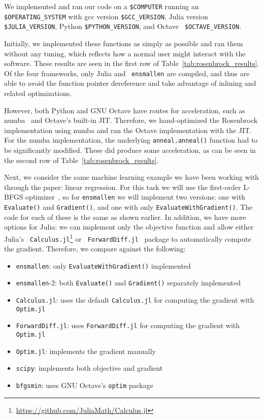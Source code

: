\documentclass{article}
\begin{document}
We implemented and ran our code on a {\tt \$COMPUTER} running an {\tt
\$OPERATING\_SYSTEM} with gcc version {\tt \$GCC\_VERSION}, Julia version {\tt
\$JULIA\_VERSION}, Python {\tt \$PYTHON\_VERSION}, and Octave {\tt
\$OCTAVE\_VERSION}.

Initially, we implemented these functions as simply as possible and ran them
without any tuning, which reflects how a normal user might interact with the
software.  These results are seen in the first row of
Table~\ref{tab:rosenbrock_results}.  Of the four frameworks, only Julia and {\tt
ensmallen} are compiled, and thus are able to avoid the function pointer
dereference and take advantage of inlining and related optimizations.

However, both Python and GNU Octave have routes for acceleration, such as
numba~\cite{TODO} and Octave's built-in JIT.  Therefore, we hand-optimized the
Rosenbrock implementation using numba and ran the Octave implementation with the
JIT.  For the numba implementation, the underlying {\tt anneal.anneal()}
function had to be significantly modified.  These did produce some acceleration,
as can be seen in the second row of Table~\ref{tab:rosenbrock_results}.

Next, we consider the same machine learning example we have been working with
through the paper: linear regression.  For this task we will use the first-order
L-BFGS optimizer~\cite{zhu1997algorithm},
so for {\tt ensmallen} we will implement two versions: one with {\tt Evaluate()}
and {\tt Gradient()}, and one with only {\tt EvaluateWithGradient()}.  The code
for each of these is the same as shown earlier.  In addition, we have more
options for Julia: we can implement only the objective function and allow either
Julia's {\tt
Calculus.jl}\footnote{\url{https://github.com/JuliaMath/Calculus.jl}} or {\tt
ForwardDiff.jl}~\cite{RevelsLubinPapamarkou2016} package to automatically
compute the gradient.  Therefore, we compare against the following:

\vspace*{-0.3em}
\begin{itemize} \itemsep -1pt
  \item {\tt ensmallen}: only {\tt EvaluateWithGradient()} implemented
  \item {\tt ensmallen}-2: both {\tt Evaluate()} and {\tt Gradient()} separately
implemented
  \item {\tt Calculus.jl}: uses the default {\tt Calculus.jl} for
computing the gradient with {\tt Optim.jl}
  \item {\tt ForwardDiff.jl}: uses {\tt ForwardDiff.jl} for computing
the gradient with {\tt Optim.jl}
  \item {\tt Optim.jl}: implements the gradient manually
  \item {\tt scipy}: implements both objective and
gradient
  \item {\tt bfgsmin}: uses GNU Octave's {\tt optim} package
\end{itemize}
\vspace*{-0.3em}
\end{document}
